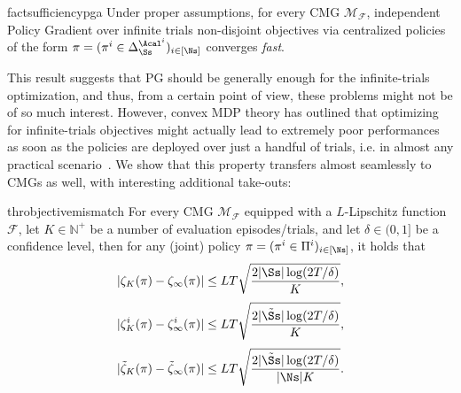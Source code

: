 \begin{restatable}{fact}{sufficiencypga}
    \label{fact:sufficiencypga} 
    Under proper assumptions, for every CMG $\mathcal M_{\mathcal F}$, independent Policy Gradient over infinite trials non-disjoint objectives via centralized policies of the form $\pi = (\pi^i\in \Delta_\Ss^{\Acal^i})_{i \in [\Ns]}$ converges \emph{fast}.
\end{restatable}

This result suggests that PG should be generally enough for the infinite-trials optimization, and thus, from a certain point of view, these problems might not be of so much interest. However, convex MDP theory has outlined that optimizing for infinite-trials objectives might actually lead to extremely poor performances as soon as the policies are deployed over just a handful of trials, i.e. in almost any practical scenario~\citep{2023mutticonvexrlfinite}. We show that this property transfers almost seamlessly to CMGs as well, with interesting additional take-outs:


\begin{restatable}{thr}{objectivemismatch}
    \label{thr:objectivemismatch} 
    For every CMG $\mathcal M_{\mathcal F}$ equipped with a $L$-Lipschitz function $\mathcal F$, let $K \in \mathbb N^+$ be a number of evaluation episodes/trials, and let $\delta \in (0, 1]$ be a confidence level, then for any (joint) policy $\pi = (\pi^i\in \Pi^i)_{i \in [\Ns]}$, it holds that
    \begin{equation*}
        |\zeta_K(\pi) - \zeta_\infty(\pi)| \leq  LT \sqrt{\frac{2 |\Ss| \log(2T/\delta)}{K}} ,
    \end{equation*}
    \begin{equation*}
        |\zeta^i_K(\pi) - \zeta^i_\infty(\pi)| \leq  LT \sqrt{\frac{2|\tilde \Ss| \log(2T/\delta)}{K}},
    \end{equation*}
    \begin{equation*}
        |\tilde \zeta_K(\pi) - \tilde \zeta_\infty(\pi)| \leq  LT \sqrt{\frac{2|\tilde \Ss| \log(2T/\delta)}{|\Ns|K}}. 
    \end{equation*}
\end{restatable}

